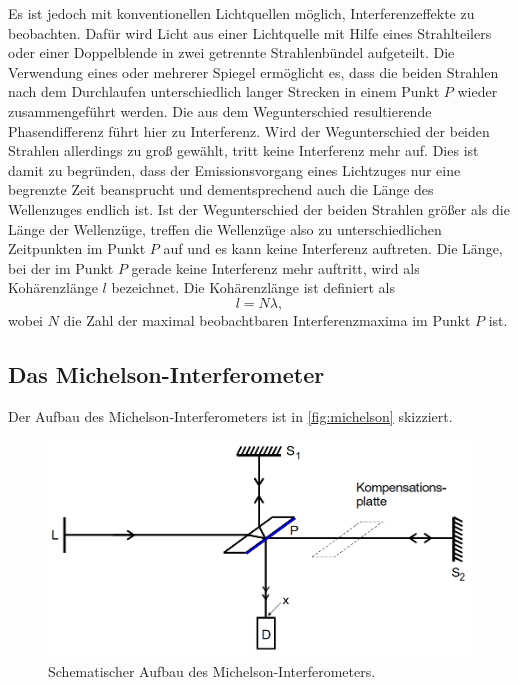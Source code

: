 Es ist jedoch mit konventionellen Lichtquellen möglich, Interferenzeffekte zu beobachten. Dafür wird Licht aus einer 
Lichtquelle mit Hilfe eines Strahlteilers oder einer Doppelblende in zwei getrennte Strahlenbündel aufgeteilt. Die 
Verwendung eines oder mehrerer Spiegel ermöglicht es, dass die beiden Strahlen nach dem Durchlaufen unterschiedlich 
langer Strecken in einem Punkt $P$ wieder zusammengeführt werden. Die aus dem Wegunterschied resultierende 
Phasendifferenz führt hier zu Interferenz. 
Wird der Wegunterschied der beiden Strahlen allerdings zu groß gewählt, tritt keine Interferenz mehr auf. Dies ist damit
zu begründen, dass der Emissionsvorgang eines Lichtzuges nur eine begrenzte Zeit beansprucht und dementsprechend auch die
Länge des Wellenzuges endlich ist. Ist der Wegunterschied der beiden Strahlen größer als die Länge der Wellenzüge, treffen
die Wellenzüge also zu unterschiedlichen Zeitpunkten im Punkt $P$ auf und es kann keine Interferenz auftreten. Die
Länge, bei der im Punkt $P$ gerade keine Interferenz mehr auftritt, wird als Kohärenzlänge $l$ bezeichnet. 
Die Kohärenzlänge ist definiert als
\begin{equation}
    l = N \lambda ,
\end{equation}
wobei $N$ die Zahl der maximal beobachtbaren Interferenzmaxima im Punkt $P$ ist. 

\subsection{Das Michelson-Interferometer}
\label{ssec:Michelson}

Der Aufbau des Michelson-Interferometers ist in \autoref{fig:michelson} skizziert. 

\begin{figure}
    \centering
    \includegraphics{content/michelson.png}
    \caption{Schematischer Aufbau des Michelson-Interferometers.}
    \label{fig:michelson}
  \end{figure}

